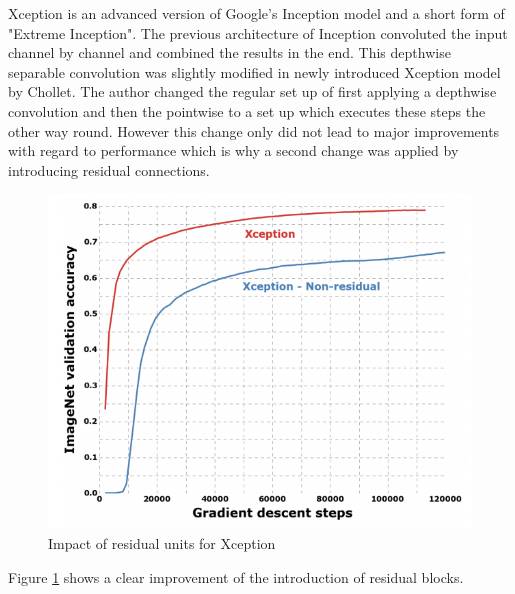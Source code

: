 Xception is an advanced version of Google's Inception model and a short form of "Extreme Inception". The previous architecture of Inception convoluted the input channel by channel and combined the results in the end. This depthwise separable convolution was slightly modified in newly introduced Xception model by Chollet\cite{chollet2017xception}. The author changed the regular set up of first applying a depthwise convolution and then the pointwise to a set up which executes these steps the other way round. However this change only did not lead to major improvements with regard to performance which is why a second change was applied by introducing residual connections\cite{chollet2017xception}.
\begin{figure}
  \centering
  \includegraphics[width=\linewidth]{figures/xception_residuals.png}
  \caption{Impact of residual units for Xception}
  \label{xception_residuals}
\end{figure}

Figure \ref{xception_residuals} shows a clear improvement of the introduction of residual blocks.

